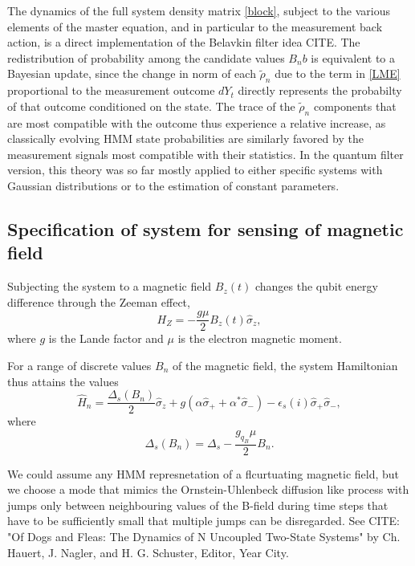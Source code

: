 \documentclass[aps,pra,twocolumn,groupedaddress,showpacs]{revtex4}
\begin{document}
The dynamics of the full system density matrix \eqref{block}, subject to the various elements of the master equation, and in particular to the measurement back action, is a direct implementation of the Belavkin filter idea CITE. The redistribution of probability among the candidate values $B_nb$ is equivalent to a Bayesian update, since the change in norm of each $\tilde{\rho}_n$ due to the term in \eqref{LME} proportional to the measurement outcome $dY_t$ directly represents the probabilty of that outcome conditioned on the state. The trace of the $\tilde{\rho}_n$ components that are most compatible with the outcome thus experience a relative increase, as classically evolving HMM state probabilities are similarly favored by the measurement signals most compatible with their statistics. In the quantum filter version, this theory was so far mostly applied to either specific systems with Gaussian distributions or to the estimation of constant parameters.

\subsection{Specification of system for sensing of magnetic field} 

Subjecting the system to a magnetic field $B_z(t)$ changes the qubit energy difference through the Zeeman effect,
\begin{equation}
H_{Z} = -\frac{g\mu}{2}B_z(t) \hat \sigma_z,
\end{equation}
where $g$ is the Lande factor and $\mu$ is the electron magnetic moment.  

For a range of discrete values $B_n$ of the magnetic field, the system Hamiltonian thus attains the values
\begin{equation}
\hat H_{n} = \frac{\Delta_s(B_n)}{2}\hat \sigma_z + g \left(\alpha \hat \sigma_+ + \alpha^* \hat \sigma_-\right) - \epsilon_s(i) \hat \sigma_+ \hat \sigma_-,
\end{equation}
where
\begin{equation}
\Delta_s(B_n) = \Delta_s - \frac{g_{q_B} \mu}{2} B_n.
\end{equation}

We could assume any HMM represnetation of a flcurtuating magnetic field, but we choose a mode that mimics the Ornstein-Uhlenbeck diffusion like process with jumps only between neighbouring values of the B-field during time steps that have to be sufficiently small that multiple jumps can be disregarded. See CITE: "Of Dogs and Fleas: The Dynamics of N Uncoupled Two-State Systems" by Ch. Hauert, J. Nagler, and H. G. Schuster, Editor, Year City. 
\end{document}
